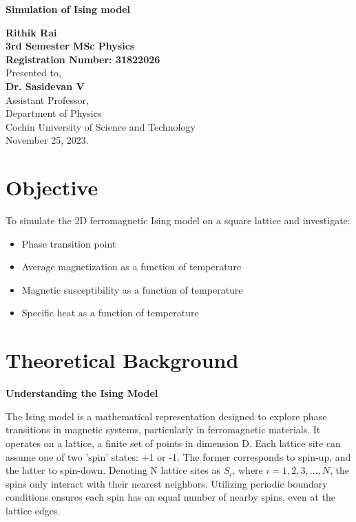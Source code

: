 \documentclass{article}
\begin{document}
\begin{titlepage}
    \begin{center}
        \vspace*{1cm}
            
        \Huge
        \textbf{Simulation of Ising model}
            
        \vspace{4cm}
        \Large  
        \textbf{Rithik Rai}\\  
        \textbf{3rd Semester MSc Physics}\\
        \textbf{Registration Number: 31822026}\\
        \vspace{4cm}
        Presented to,\\
        \textbf{Dr. Sasidevan V}\\
        Assistant Professor,\\
        Department of Physics\\
        Cochin University of Science and Technology\\
        November 25, 2023.
            
    \end{center}
\end{titlepage}

\section{Objective}

To simulate the 2D ferromagnetic Ising model on a square lattice and investigate:
\begin{itemize}
    \item Phase transition point
    \item Average magnetization as a function of temperature
    \item Magnetic susceptibility as a function of temperature
    \item Specific heat as a function of temperature
\end{itemize}

\section{Theoretical Background}
\textbf{Understanding the Ising Model}

The Ising model is a mathematical representation designed to explore phase transitions in magnetic systems, particularly in ferromagnetic materials. It operates on a lattice, a finite set of points in dimension D. Each lattice site can assume one of two 'spin' states: +1 or -1. The former corresponds to spin-up, and the latter to spin-down. Denoting N lattice sites as $S_{i}$, where $i = 1, 2, 3, \ldots, N$, the spins only interact with their nearest neighbors. Utilizing periodic boundary conditions ensures each spin has an equal number of nearby spins, even at the lattice edges.
\end{document}
